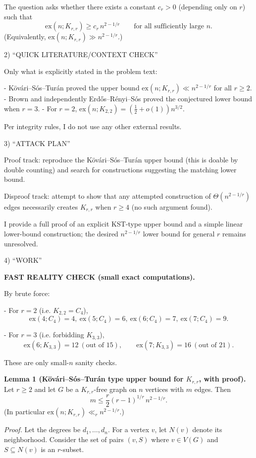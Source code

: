 The question asks whether there exists a constant $c_r>0$ (depending only on $r$) such that
\[
\mathrm{ex}(n;K_{r,r}) \ge c_r\, n^{2-1/r}
\qquad\text{for all sufficiently large }n.
\]
(Equivalently, $\mathrm{ex}(n;K_{r,r})\gg n^{2-1/r}$.)

2) “QUICK LITERATURE/CONTEXT CHECK”

Only what is explicitly stated in the problem text:

- K\"{o}v\'{a}ri--S\'{o}s--Tur\'{a}n proved the upper bound $\mathrm{ex}(n;K_{r,r})\ll n^{2-1/r}$ for all $r\ge 2$.
- Brown and independently Erd\H{o}s--R\'{e}nyi--S\'{o}s proved the conjectured lower bound when $r=3$.
- For $r=2$, $\mathrm{ex}(n;K_{2,2})=(\tfrac12+o(1))n^{3/2}$.

Per integrity rules, I do not use any other external results.

3) “ATTACK PLAN”

Proof track: reproduce the K\"{o}v\'{a}ri--S\'{o}s--Tur\'{a}n upper bound (this is doable by double counting) and search for constructions suggesting the matching lower bound.

Disproof track: attempt to show that any attempted construction of $\Theta(n^{2-1/r})$ edges necessarily creates $K_{r,r}$ when $r\ge 4$ (no such argument found).

I provide a full proof of an explicit KST-type upper bound and a simple linear lower-bound construction; the desired $n^{2-1/r}$ lower bound for general $r$ remains unresolved.

4) “WORK”

\textbf{FAST REALITY CHECK (small exact computations).}

By brute force:

- For $r=2$ (i.e. $K_{2,2}=C_4$),
\[
\mathrm{ex}(4;C_4)=4,\ \mathrm{ex}(5;C_4)=6,\ \mathrm{ex}(6;C_4)=7,\ \mathrm{ex}(7;C_4)=9.
\]

- For $r=3$ (i.e. forbidding $K_{3,3}$),
\[
\mathrm{ex}(6;K_{3,3})=12\ (\text{out of }15),\qquad \mathrm{ex}(7;K_{3,3})=16\ (\text{out of }21).
\]

These are only small-$n$ sanity checks.

\medskip
\textbf{Lemma 1 (K\"{o}v\'{a}ri--S\'{o}s--Tur\'{a}n type upper bound for $K_{r,r}$, with proof).}
Let $r\ge 2$ and let $G$ be a $K_{r,r}$-free graph on $n$ vertices with $m$ edges.
Then
\[
 m \le \frac{r}{2}(r-1)^{1/r}\, n^{2-1/r}.
\]
(In particular $\mathrm{ex}(n;K_{r,r})\ll_r n^{2-1/r}$.)

\emph{Proof.}
Let the degrees be $d_1,\dots,d_n$.
For a vertex $v$, let $N(v)$ denote its neighborhood.
Consider the set of pairs $(v,S)$ where $v\in V(G)$ and $S\subseteq N(v)$ is an $r$-subset.

